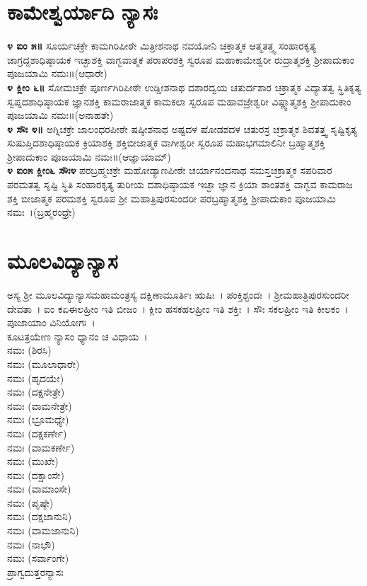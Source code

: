 \section{ಕಾಮೇಶ್ವರ್ಯಾದಿ ನ್ಯಾಸಃ}
{\bfseries ೪ ಐಂ ೫॥} ಸೂರ್ಯಚಕ್ರೇ ಕಾಮಗಿರಿಪೀಠೇ ಮಿತ್ರೀಶನಾಥ ನವಯೋನಿ ಚಕ್ರಾತ್ಮಕ ಆತ್ಮತತ್ತ್ವ  ಸಂಹಾರಕೃತ್ಯ ಜಾಗ್ರದ್ದಶಾಧಿಷ್ಠಾಯಕ ಇಚ್ಛಾಶಕ್ತಿ ವಾಗ್ಭವಾತ್ಮಕ ಪರಾಪರಶಕ್ತಿ ಸ್ವರೂಪ ಮಹಾಕಾಮೇಶ್ವರೀ ರುದ್ರಾತ್ಮಶಕ್ತಿ  ಶ್ರೀಪಾದುಕಾಂ ಪೂಜಯಾಮಿ ನಮಃ॥(ಆಧಾರೇ)\\
{\bfseries೪ ಕ್ಲೀಂ ೬॥} ಸೋಮಚಕ್ರೇ ಪೂರ್ಣಗಿರಿಪೀಠೇ ಉಡ್ಡೀಶನಾಥ  ದಶಾರದ್ವಯ ಚತುರ್ದಶಾರ ಚಕ್ರಾತ್ಮಕ ವಿದ್ಯಾತತ್ವ ಸ್ಥಿತಿಕೃತ್ಯ ಸ್ವಪ್ನದಶಾಧಿಷ್ಠಾಯಕ ಜ್ಞಾನಶಕ್ತಿ ಕಾಮರಾಜಾತ್ಮಕ ಕಾಮಕಲಾ ಸ್ವರೂಪ ಮಹಾವಜ್ರೇಶ್ವರೀ ವಿಷ್ಣ್ವಾತ್ಮಶಕ್ತಿ  ಶ್ರೀಪಾದುಕಾಂ ಪೂಜಯಾಮಿ ನಮಃ॥(ಅನಾಹತೇ)\\
{\bfseries೪ ಸೌಃ ೪॥} ಅಗ್ನಿಚಕ್ರೇ ಜಾಲಂಧರಪೀಠೇ  ಷಷ್ಠೀಶನಾಥ ಅಷ್ಟದಳ ಷೋಡಶದಳ ಚತುರಸ್ರ ಚಕ್ರಾತ್ಮಕ ಶಿವತತ್ತ್ವ  ಸೃಷ್ಟಿಕೃತ್ಯ ಸುಷುಪ್ತಿದಶಾಧಿಷ್ಠಾಯಕ ಕ್ರಿಯಾಶಕ್ತಿ ಶಕ್ತಿಬೀಜಾತ್ಮಕ ವಾಗೀಶ್ವರೀ ಸ್ವರೂಪ ಮಹಾಭಗಮಾಲಿನೀ ಬ್ರಹ್ಮಾತ್ಮಶಕ್ತಿ  ಶ್ರೀಪಾದುಕಾಂ ಪೂಜಯಾಮಿ ನಮಃ॥(ಆಜ್ಞಾಯಾಮ್)\\
{\bfseries ೪ ಐಂ೫ ಕ್ಲೀಂ೬ ಸೌಃ೪} ಪರಬ್ರಹ್ಮಚಕ್ರೇ ಮಹೋಡ್ಯಾಣಪೀಠೇ ಚರ್ಯಾನಂದನಾಥ ಸಮಸ್ತಚಕ್ರಾತ್ಮಕ ಸಪರಿವಾರ ಪರಮತತ್ವ ಸೃಷ್ಟಿ ಸ್ಥಿತಿ ಸಂಹಾರಕೃತ್ಯ ತುರೀಯ ದಶಾಧಿಷ್ಠಾಯಕ ಇಚ್ಛಾ ಜ್ಞಾನ ಕ್ರಿಯಾ ಶಾಂತಶಕ್ತಿ ವಾಗ್ಭವ ಕಾಮರಾಜ ಶಕ್ತಿ ಬೀಜಾತ್ಮಕ ಪರಮಶಕ್ತಿ ಸ್ವರೂಪ ಶ್ರೀ ಮಹಾತ್ರಿಪುರಸುಂದರೀ ಪರಬ್ರಹ್ಮಾತ್ಮಶಕ್ತಿ ಶ್ರೀಪಾದುಕಾಂ ಪೂಜಯಾಮಿ ನಮಃ~।(ಬ್ರಹ್ಮರಂಧ್ರೇ)
\section{ಮೂಲವಿದ್ಯಾನ್ಯಾಸ}
ಅಸ್ಯ ಶ್ರೀ ಮೂಲವಿದ್ಯಾನ್ಯಾಸಮಹಾಮಂತ್ರಸ್ಯ ದಕ್ಷಿಣಾಮೂರ್ತಿಃ ಋಷಿಃ~। ಪಂಕ್ತಿಶ್ಛಂದಃ~। ಶ್ರೀಮಹಾತ್ರಿಪುರಸುಂದರೀ ದೇವತಾ~। ಐಂ ಕಏಈಲಹ್ರೀಂ ಇತಿ ಬೀಜಂ~। ಕ್ಲೀಂ ಹಸಕಹಲಹ್ರೀಂ ಇತಿ ಶಕ್ತಿಃ~। ಸೌಃ ಸಕಲಹ್ರೀಂ ಇತಿ ಕೀಲಕಂ~। ಪೂಜಾಯಾಂ ವಿನಿಯೋಗಃ~।\\
ಕೂಟತ್ರಯೇಣ ನ್ಯಾಸಂ ಧ್ಯಾನಂ ಚ ವಿಧಾಯ~।\\
 ನಮಃ (ಶಿರಸಿ)\\
 ನಮಃ (ಮೂಲಾಧಾರೇ)\\
 ನಮಃ (ಹೃದಯೇ)\\
 ನಮಃ (ದಕ್ಷನೇತ್ರೇ)\\
 ನಮಃ (ವಾಮನೇತ್ರೇ)\\
 ನಮಃ (ಭ್ರೂಮಧ್ಯೇ)\\
 ನಮಃ (ದಕ್ಷಕರ್ಣೇ)\\
 ನಮಃ (ವಾಮಕರ್ಣೇ)\\
 ನಮಃ (ಮುಖೇ)\\
 ನಮಃ (ದಕ್ಷಾಂಸೇ)\\
 ನಮಃ (ವಾಮಾಂಸೇ)\\
 ನಮಃ (ಪೃಷ್ಠೇ)\\
 ನಮಃ (ದಕ್ಷಜಾನುನಿ)\\
 ನಮಃ (ವಾಮಜಾನುನಿ)\\
 ನಮಃ (ನಾಭೌ)\\
 ನಮಃ (ಸರ್ವಾಂಗೇ)\\
ಪ್ರಾಗ್ವದುತ್ತರನ್ಯಾಸಃ
